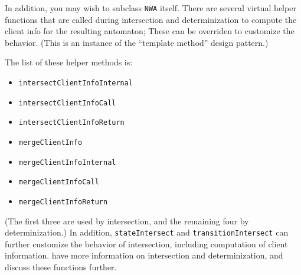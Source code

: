 In addition, you may wish to subclass \texttt{NWA} itself. There are several
virtual helper functions that are called during intersection and
determinization to compute the client info for the resulting automaton; These
can be overriden to customize the behavior. (This is an instance
of the ``template method'' design pattern.)

The list of these helper methods is:
\begin{itemize}
  \item \texttt{intersectClientInfoInternal}
  \item \texttt{intersectClientInfoCall}
  \item \texttt{intersectClientInfoReturn}
  \item \texttt{mergeClientInfo}
  \item \texttt{mergeClientInfoInternal}
  \item \texttt{mergeClientInfoCall}
  \item \texttt{mergeClientInfoReturn}
\end{itemize}
(The first three are used by intersection, and the remaining four by
determinization.) In addition, \texttt{stateIntersect} and
\texttt{transitionIntersect} can further customize the behavior of
intersection, including computation of client
information.  have more information on
intersection and determinization, and discuss these functions further.


